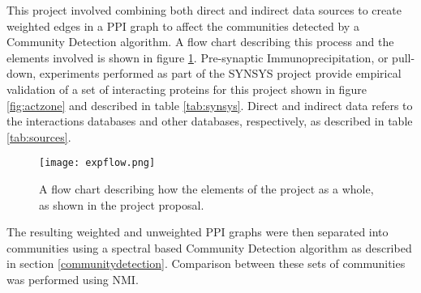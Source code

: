 This project involved combining both direct and indirect data sources to create weighted edges in a \ac{PPI} graph to affect the communities detected by a Community Detection algorithm.
A flow chart describing this process and the elements involved is shown in figure \ref{fig:expflow}.
Pre-synaptic Immunoprecipitation, or pull-down, experiments performed as part of the SYNSYS project\autocite{synsys} provide empirical validation of a set of interacting proteins for this project shown in figure \ref{fig:actzone} and described in table \ref{tab:synsys}.
Direct and indirect data refers to the interactions databases and other databases, respectively, as described in table \ref{tab:sources}.


\begin{figure}
    \centering
    \texttt{[image: expflow.png]}
    \caption{A flow chart describing how the elements of the project as a whole, as shown in the project proposal.}
    \label{fig:expflow}
\end{figure}

The resulting weighted and unweighted \ac{PPI} graphs were then separated into communities using a spectral based Community Detection algorithm as described in section \ref{communitydetection}.
Comparison between these sets of communities was performed using \ac{NMI}\autocite{lancichinetti_benchmark_2008}.

